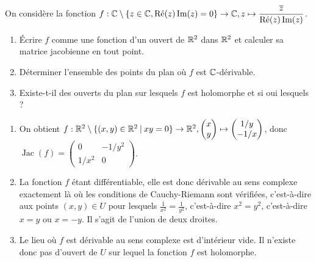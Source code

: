 \begin{exo}
On considère la fonction $f : \C\setminus \{z\in\C, \PR(z)\PI(z)=0\}\to \C, z\mapsto \dfrac{\overline{z}}{\PR(z)\PI(z)}$.
\begin{enumerate}
\item Écrire $f$ comme une fonction d'un ouvert de $\R^2$ dans $\R^2$ et calculer sa matrice jacobienne en tout point.
\item Déterminer l'ensemble des points du plan où $f$ est $\C$-dérivable.
\item Existe-t-il des ouverts du plan sur lesquels $f$ est holomorphe et si oui lesquels ?
\end{enumerate}

\begin{sol}
\begin{enumerate}
\item On obtient $f : \R^2 \setminus \{(x,y)\in\R^2\:|\:xy=0\} \to \R^2, \vecteur{x}{y} \mapsto \vecteur{1/y}{-1/x}$,  donc
$ \operatorname{Jac}(f) = \begin{pmatrix}
0 & -1/y^2 \\
1/x^2 & 0
\end{pmatrix}
$.
\item La fonction $f$ étant différentiable, elle est donc dérivable au sens complexe exactement là où les conditions de Cauchy-Riemann sont vérifiées, c'est-à-dire aux points $(x,y) \in U$ pour lesquels $\frac{1}{x^2} = \frac{1}{y^2}$, c'est-à-dire $x^2=y^2$, c'est-à-dire $x=y$ ou $x=-y$. Il s'agit de l'union de deux droites.
\item Le lieu où $f$ est dérivable au sens complexe est d'intérieur vide. Il n'existe donc pas d'ouvert de $U$ sur lequel la fonction $f$ est holomorphe.

\end{enumerate}
\end{sol}
\end{exo}

%

